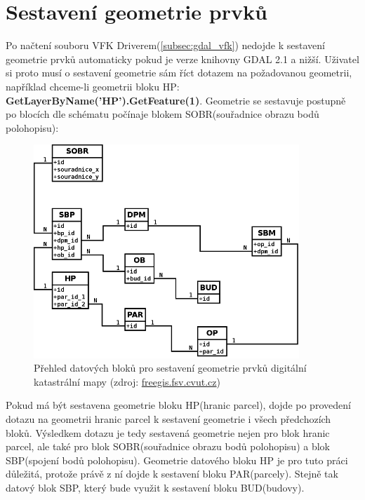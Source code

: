\section{Sestavení geometrie prvků}
\label{sec:sestaveni_geometrie}
Po načtení  souboru VFK Driverem(\ref{subsec:gdal_vfk})
nedojde k sestavení geometrie prvků automaticky pokud je verze
knihovny GDAL 2.1 a nižší. Uživatel si proto musí o sestavení
geometrie sám říct dotazem na požadovanou geometrii, například
chceme-li geometrii bloku HP:
\textbf{GetLayerByName('HP').GetFeature(1)}. Geometrie se sestavuje
postupně po blocích dle schématu počínaje blokem SOBR(souřadnice
obrazu bodů polohopisu):
\begin{figure}[H]
	 \centering
      \includegraphics[width=10cm]{./pictures/Vfk-diagram-geom.png}
      \caption{Přehled datových bloků pro sestavení geometrie prvků digitální katastrální mapy (zdroj:
      \href{http://freegis.fsv.cvut.cz/wiki/images/thumb/8/8a/Vfk-diagram-geom.png/744px-Vfk-diagram-geom.png}{freegis.fsv.cvut.cz})}
      \label{fig:vfk_diagram_geom}
  \end{figure}
Pokud má být sestavena geometrie bloku HP(hranic parcel), dojde po
provedení dotazu na geometrii hranic parcel k sestavení geometrie i
všech předchozích bloků. Výsledkem dotazu je tedy sestavená geometrie
nejen pro blok hranic parcel, ale také pro blok SOBR(souřadnice obrazu
bodů polohopisu) a blok SBP(spojení bodů polohopisu). Geometrie
datového bloku HP je pro tuto práci důležitá, protože právě z ní dojde
k sestavení bloku PAR(parcely). Stejně tak datový blok SBP, který bude
využit k sestavení bloku BUD(budovy).

